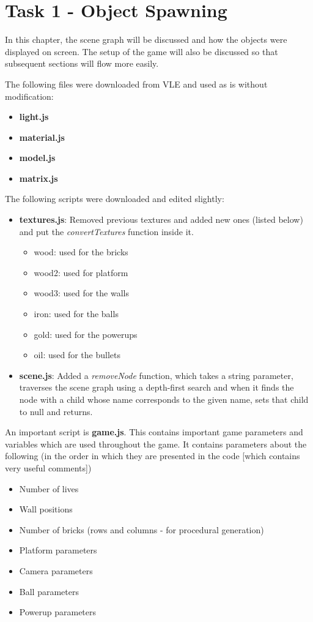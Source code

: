\chapter{Task 1 - Object Spawning}
In this chapter, the scene graph will be discussed and how the objects were displayed on screen. The setup of the game will also be discussed so that subsequent sections will flow more easily.

The following files were downloaded from VLE and used as is without modification:
\begin{itemize}
	\item \textbf{light.js}
	\item \textbf{material.js}
	\item \textbf{model.js}
	\item \textbf{matrix.js}
\end{itemize}

The following scripts were downloaded and edited slightly:

\begin{itemize}
	\item \textbf{textures.js}: Removed previous textures and added new ones (listed below) and put the \textit{convertTextures} function inside it.
	\begin{itemize}
		\item wood: used for the bricks
		\item wood2: used for platform
		\item wood3: used for the walls
		\item iron: used for the balls
		\item gold: used for the powerups
		\item oil: used for the bullets
	\end{itemize}

	\item \textbf{scene.js}: Added a \textit{removeNode} function, which takes a string parameter, traverses the scene graph using a depth-first search and when it finds the node with a child whose name corresponds to the given name, sets that child to null and returns.
\end{itemize}

An important script is \textbf{game.js}. This contains important game parameters and variables which are used throughout the game. It contains parameters about the following (in the order in which they are presented in the code [which contains very useful comments])
\begin{itemize}
	\item Number of lives
	\item Wall positions
	\item Number of bricks (rows and columns - for procedural generation)
	\item Platform parameters
	\item Camera parameters
	\item Ball parameters
	\item Powerup parameters
\end{itemize}

